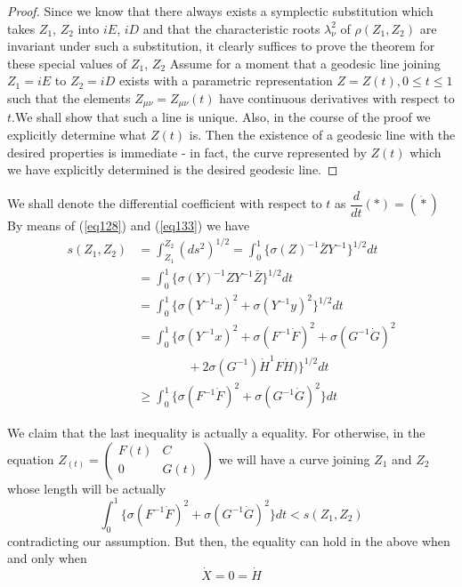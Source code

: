 \begin{proof}%
Since we know that  there always exists a symplectic substitution which
takes $Z_1$, $Z_2$ into $iE$, $i D$ and that the characteristic roots
$\lambda^2_\nu$ of $\rho (Z_1 , Z_2)$ are invariant under such a
substitution, it clearly suffices to prove the theorem for these
special values of $Z_1$, $Z_2$ Assume for a moment that a geodesic line
joining $Z_1 = iE$ to $Z_2 = iD$ exists with a parametric
representation $Z = Z(t), 0\le t \le 1 $ such  that the elements $Z_{\mu
  \nu} = Z_{\mu \nu}(t)$ have continuous derivatives with respect to 
$t$.\pageoriginale  We shall show that such a line is unique. Also, in
the course 
of the proof we explicitly determine what $Z(t)$ is. Then the
existence of a geodesic line with the desired properties is immediate
- in fact, the curve represented by $Z(t)$ which we have explicitly
determined is the desired geodesic line. 
\end{proof}

We shall denote the differential coefficient with respect to $t$ as\break
$\dfrac{d}{dt} (*)  = (\dot{\ast})$ By means of (\ref{eq128}) and
(\ref{eq133}) we have   
\begin{align*}
s(Z_1 ,Z_2) & = \int^{Z_2}_{Z_1} (d s^2 )^{1/2} =
\int^1_0 \big \{ \sigma (Z)^{-1} \bar{Z} Y^{-1} \big\}^{1/2} dt \\ 
& =  \int^1_0 \big \{ \sigma (Y)^{-1} {Z} Y^{-1} \bar{Z}\big\}^{1/2}
dt \\ 
& = \int^1_0 \big \{ \sigma (Y^{-1}x)^2 + \sigma (Y^{-1} y)^2
\big\}^{1/2} dt\\ 
& = \int^1_0 \big \{ \sigma (Y^{-1}x)^2 + \sigma (F^{-1}\dot{F})^2 +\sigma
(G^{-1} \dot{G})^2 \\
& \qquad \qquad + 2 \sigma(G^{-1}) \dot{H}^1 F \dot{H} ) \big\}^{1/2} dt\\ 
& \ge  \int^1_0 \big \{ \sigma (F^{-1} \dot{F})^2 + \sigma (G^{-1}
\dot{G})^2 \big\} dt	 
\end{align*}

We claim that the last inequality is actually a equality. For
otherwise, in the equation $Z_{(t)} = \begin{pmatrix}F(t) & C \\ 0 &
  G(t) \end{pmatrix}$ we will have a curve joining $Z_1 $ and $Z_2$
whose length will be actually 	 
$$
\int^1_0 \{ \sigma (F^{-1} \dot{F})^2 + \sigma (G^{-1} \dot{G})^2  \} dt <
s(Z_1, Z_2) 
$$
contradicting our assumption. But then, the equality can hold in the
above when and only when  
\begin{equation*}
\dot{X} = 0 = \dot{H}\tag{135}\label{eq135}
\end{equation*}
 
